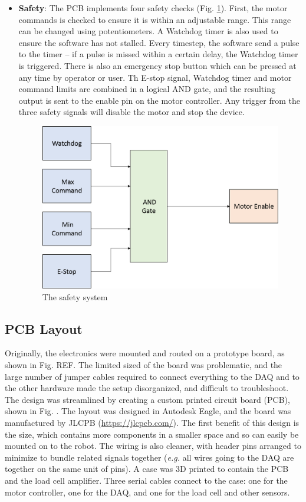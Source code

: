 \documentclass[12pt]{report}
\begin{document}
\begin{itemize}
	\item \textbf{Safety}: The PCB implements four safety checks (Fig. \ref{fig:safety}). First, the motor commands is checked to ensure it is within an adjustable range. This range can be changed using potentiometers. A Watchdog timer is also used to ensure the software has not stalled. Every timestep, the software send a pulse to the timer -- if a pulse is missed within a certain delay, the Watchdog timer is triggered. There is also an emergency stop button which can be pressed at any time by operator or user. Th E-stop signal, Watchdog timer and motor command limits are combined in a logical AND gate, and the resulting output is sent to the enable pin on the motor controller. Any trigger from the three safety signals will disable the motor and stop the device.

	\begin{figure}[h] 
		\centering
		\includegraphics[width=0.6\linewidth]{electronics_safety}
		\caption{The safety system}
		\label{fig:safety}
	\end{figure}	
	 
	\end{itemize}

		
		\subsection{PCB Layout}
		
		Originally, the electronics were mounted and routed on a prototype board, as shown in Fig. REF. The limited sized of the board was problematic, and the large number of jumper cables required to connect everything to the DAQ and to the other hardware made the setup disorganized, and difficult to troubleshoot. The design was streamlined by creating a custom printed circuit board (PCB), shown in Fig. . The layout was designed in Autodesk Eagle, and the board was manufactured by JLCPB (\url{https://jlcpcb.com/}). The first benefit of this design is the size, which contains more components in a smaller space and so can easily be mounted on to the robot. The wiring is also cleaner, with header pins arranged to minimize to bundle related signals together (\textit{e.g.} all wires going to the DAQ are together on the same unit of pins). A case was 3D printed to contain the PCB and the load cell amplifier. Three serial cables connect to the case: one for the motor controller, one for the DAQ, and one for the load cell and other sensors. 
		
\end{document}
